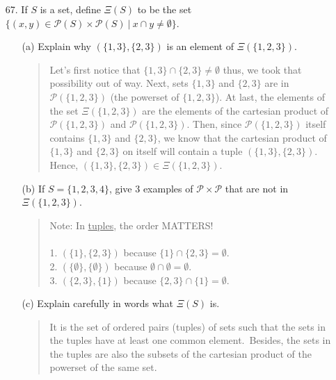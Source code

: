 \documentclass[12pt, a4paper]{article}                      %
\begin{document}
\begin{itemize}
\item[]
\item[]

\item[67.]
If $S$ is a set, define $\Xi(S)$ to be the set $\{(x, y) \in \mathcal{P}(S) \times \mathcal{P}(S) \ | \ x \cap y \neq \emptyset\}$.
\begin{itemize}
\item[(a)]
Explain why $(\{1, 3\}, \{2, 3\})$ is an element of $\Xi(\{1, 2, 3\})$.
\begin{quote}
Let's first notice that $\{1, 3\} \cap \{2, 3\} \neq \emptyset$ thus, we took that possibility out of way.
Next, sets $\{1, 3\}$ and $\{2, 3\}$ are in $\mathcal{P}(\{1, 2, 3\})$ (the powerset of $\{1, 2, 3\}$).
At last, the elements of the set $\Xi(\{1, 2, 3\})$ are the elements of the cartesian product of $\mathcal{P}(\{1, 2, 3\})$ and $\mathcal{P}(\{1, 2, 3\})$.
Then, since $\mathcal{P}(\{1, 2, 3\})$ itself contains $\{1, 3\}$ and $\{2, 3\}$, we know that the cartesian product of $\{1, 3\}$ and $\{2, 3\}$ on itself will
contain a tuple $(\{1, 3\}, \{2, 3\})$. Hence, $(\{1, 3\}, \{2, 3\}) \in \Xi(\{1, 2, 3\})$.
\end{quote}

\item[]

\item[(b)]
If $S = \{1, 2, 3, 4\}$, give 3 examples of $\mathcal{P} \times \mathcal{P}$
that are not in $\Xi(\{1, 2, 3\})$.
\begin{quote}
Note: In \underline{tuples}, the order MATTERS!\\\\
1. $(\{1\}, \{2, 3\})$ because $\{1\} \cap \{2, 3\} = \emptyset$.\\
2. $(\{\emptyset\}, \{\emptyset\})$ because $\emptyset \cap \emptyset = \emptyset$.\\
3. $(\{2, 3\}, \{1\})$ because $\{2, 3\} \cap \{1\} = \emptyset$.\\
\end{quote}

\item[(c)]
Explain carefully in words what $\Xi(S)$ is.\\
\begin{quote}
It is the set of ordered pairs (tuples) of sets such that the sets in the tuples
have at least one common element.\ Besides, the sets in the tuples are also the subsets
of the cartesian product of the powerset of the same set.
\end{quote}


\end{itemize}
\end{itemize}
\end{document}
